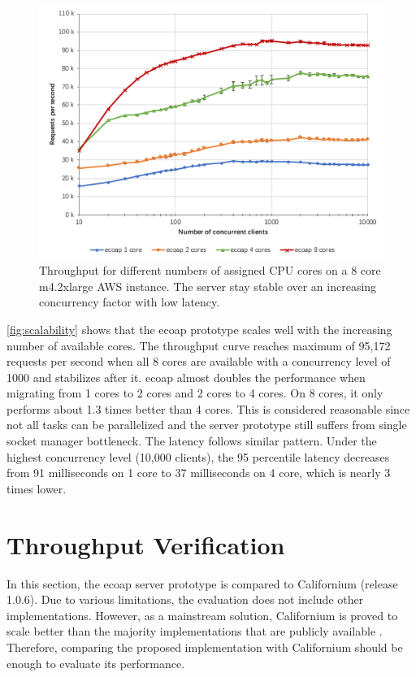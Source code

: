 \begin{figure}[!htbp]
\centering
\includegraphics[scale = 0.8]{vertical_scalability}
\caption[Throughput for different numbers of assigned CPU cores on a 8 core m4.2xlarge AWS instance]{Throughput for different numbers of assigned CPU cores on a 8 core m4.2xlarge AWS instance. The server stay stable over an increasing concurrency factor with low latency.}
\label{fig:scalability}
\end{figure}

\autoref{fig:scalability} shows that the ecoap prototype scales well with the increasing number of available cores. The throughput curve reaches maximum of 95,172 requests per second when all 8 cores are available with a concurrency level of 1000 and stabilizes after it. ecoap almost doubles the performance when migrating from 1 cores to 2 cores and 2 cores to 4 cores. On 8 cores, it only performs about 1.3 times better than 4 cores. This is considered reasonable since not all tasks can be parallelized and the server prototype still suffers from single socket manager bottleneck. The latency follows similar pattern. Under the highest concurrency level (10,000 clients), the 95 percentile latency decreases from 91 milliseconds on 1 core to 37 milliseconds on 4 core, which is nearly 3 times lower.

\section{Throughput Verification}

In this section, the ecoap server prototype is compared to Californium (release 1.0.6). Due to various limitations, the evaluation does not include other implementations. However, as a mainstream solution, Californium is proved to scale better than the majority implementations that are publicly available \cite{lanter2013scalability}\cite{kovatsch2014californium}\cite{kovatsch2015scalable}. Therefore, comparing the proposed implementation with Californium should be enough to evaluate its performance. 

